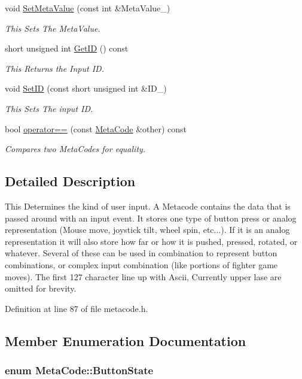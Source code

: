 \begin{DoxyCompactItemize}
void \hyperlink{classMetaCode_a1e410df95815b4d7e94b971bb1b8ba1e}{SetMetaValue} (const int \&MetaValue\_\-)
\begin{DoxyCompactList}\small\item\em This Sets The MetaValue. \item\end{DoxyCompactList}\item 
short unsigned int \hyperlink{classMetaCode_a680b5e1c2ce8d8d08d00f10187728547}{GetID} () const 
\begin{DoxyCompactList}\small\item\em This Returns the Input ID. \item\end{DoxyCompactList}\item 
void \hyperlink{classMetaCode_a0eb10030320a1fcfdda3b867b90e629f}{SetID} (const short unsigned int \&ID\_\-)
\begin{DoxyCompactList}\small\item\em This Sets The input ID. \item\end{DoxyCompactList}\item 
bool \hyperlink{classMetaCode_a296b774682a9326494e0c2d1b357ec2a}{operator==} (const \hyperlink{classMetaCode}{MetaCode} \&other) const 
\begin{DoxyCompactList}\small\item\em Compares two MetaCodes for equality. \item\end{DoxyCompactList}\end{DoxyCompactItemize}


\subsection{Detailed Description}
This Determines the kind of user input. A Metacode contains the data that is passed around with an input event. It stores one type of button press or analog representation (Mouse move, joystick tilt, wheel spin, etc...). If it is an analog representation it will also store how far or how it is pushed, pressed, rotated, or whatever. Several of these can be used in combination to represent button combinations, or complex input combination (like portions of fighter game moves). The first 127 character line up with Ascii, Currently upper lase are omitted for brevity. 

Definition at line 87 of file metacode.h.

\subsection{Member Enumeration Documentation}
\hypertarget{classMetaCode_a8bcce67af20f4f779ba6f5387e438077}{
\subsubsection[{ButtonState}]{\setlength{\rightskip}{0pt plus 5cm}enum {\bf MetaCode::ButtonState}}}
\label{d7/d72/classMetaCode_a8bcce67af20f4f779ba6f5387e438077}


